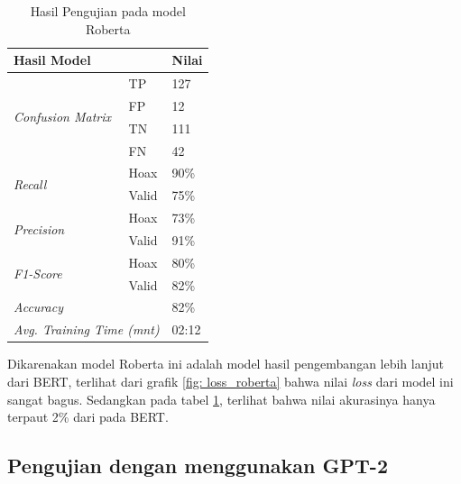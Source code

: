 \begin{table}[h]
    \caption{Hasil Pengujian pada model Roberta}
    \label{tab: loss_roberta}
    \centering
    \begin{tabular}{|l|l|l|}
        \hline
        \multicolumn{2}{|l|}{\textbf{Hasil Model}}              & \textbf{Nilai}        \\ \hline
        \multirow{4}{*}{\textit{Confusion Matrix}}              & TP             & 127  \\ \cline{2-3}
                                                                & FP             & 12   \\ \cline{2-3}
                                                                & TN             & 111  \\ \cline{2-3}
                                                                & FN             & 42   \\ \hline
        \multirow{2}{*}{\textit{Recall}}                        & Hoax           & 90\% \\ \cline{2-3}
                                                                & Valid          & 75\% \\ \hline
        \multirow{2}{*}{\textit{Precision}}                     & Hoax           & 73\% \\ \cline{2-3}
                                                                & Valid          & 91\% \\ \hline
        \multirow{2}{*}{\textit{F1-Score}}                      & Hoax           & 80\% \\ \cline{2-3}
                                                                & Valid          & 82\% \\ \hline
        \multicolumn{2}{|l|}{\textit{Accuracy}}                 & 82\%                  \\ \hline
        \multicolumn{2}{|l|}{\textit{Avg. Training Time (mnt)}} & 02:12                 \\ \hline
    \end{tabular}
\end{table}

Dikarenakan model Roberta ini adalah model hasil pengembangan lebih lanjut dari BERT, terlihat dari grafik \ref{fig: loss_roberta} bahwa nilai \textit{loss} dari model ini sangat bagus. Sedangkan pada tabel \ref{tab: loss_roberta}, terlihat bahwa nilai akurasinya hanya terpaut 2\% dari pada BERT.

\subsection{Pengujian dengan menggunakan GPT-2}

